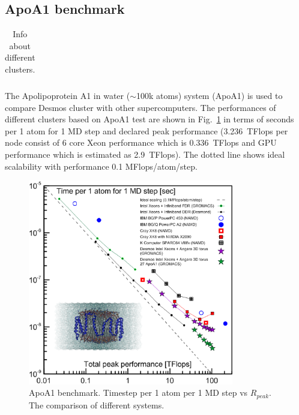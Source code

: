 \documentclass{llncs}
\begin{document}
\newpage
\subsection{ApoA1 benchmark}

\begin{table}[h]
\caption{\label{tab:supercomputers}Info about different clusters.}
\begin{center}
\renewcommand{\arraystretch}{1}
\begin{tabular}{|p{33mm}|p{80mm}|}
\hline
\end{tabular}
\end{center}
\end{table}

The Apolipoprotein A1 in water ($\sim$100k atoms) system (ApoA1) is used to compare Desmos cluster with other supercomputers. The performances of different clusters based on ApoA1 test are shown in Fig.~\ref{ApoA1} in terms of seconds per 1 atom for 1 MD step and declared peak performance (3.236~TFlops per node consist of 6 core Xeon performance which is 0.336~TFlops and GPU performance which is estimated as 2.9~TFlops). The dotted line shows ideal scalability with performance 0.1 MFlops/atom/step.

\begin{figure}[h!]
\centering
\includegraphics[width=0.8\textwidth]{img/compar_comp.eps}
\caption{\label{ApoA1}ApoA1 benchmark. Timestep per 1 atom per 1 MD step vs $R_{peak}$. The comparison of different systems.}
\end{figure}
\end{document}
